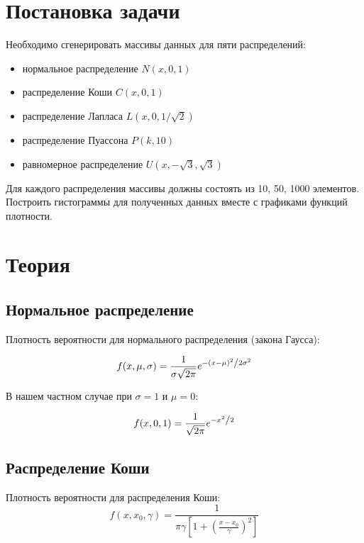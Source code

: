 \section{Постановка задачи}
Необходимо сгенерировать массивы данных для пяти распределений:
\begin{itemize}
\item нормальное распределение \( N(x, 0, 1) \)
\item распределение Коши \( C(x, 0, 1) \)
\item распределение Лапласа \( L(x, 0, 1/\sqrt{2}) \)
\item распределение Пуассона \( P(k, 10) \)
\item равномерное распределение \( U(x, -\sqrt{3}, \sqrt{3}) \)
\end{itemize}
Для каждого распределения массивы должны состоять из 10, 50, 1000 элементов. Построить гистограммы для полученных данных вместе с графиками функций плотности.



\section{Теория}
\subsection{Нормальное распределение}
Плотность вероятности для нормального распределения (закона Гаусса):

\begin{equation}
  f(x, \mu, \sigma) = \frac{1}{{\sigma \sqrt {2\pi } }}e^{{{ - \left( {x - \mu } \right)^2 } \mathord{\left/ {\vphantom {{ - \left( {x - \mu } \right)^2 } {2\sigma ^2 }}} \right. \kern-\nulldelimiterspace} {2\sigma ^2 }}}
\end{equation}
 
В нашем частном случае при \( \sigma = 1 \) и \( \mu = 0 \):

\begin{equation} 
  f(x, 0, 1) = \frac{1}{ \sqrt {2\pi } }e^{{{ -{x}^2 } \mathord{\left/ {\vphantom {{ -{x}^2 } {2\sigma ^2 }}} \right. \kern-\nulldelimiterspace} {2}}}
\end{equation}


\subsection{Распределение Коши}
Плотность вероятности для распределения Коши:
\begin{equation} 
f(x, {x_0}, \gamma) =  \frac{1}{\pi\gamma \left[1 + \left(\frac{x-x_0}{\gamma}\right)^2\right]}
\end{equation}

